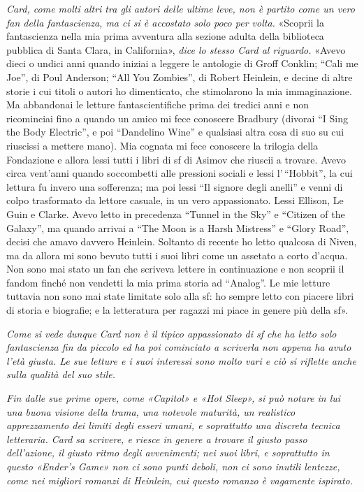 {\emph{{Card, come molti altri tra gli autori delle ultime leve, non è
		partito come un vero fan della fantascienza, ma ci si è accostato solo
		poco per volta.}}{ «Scoprii la fantascienza nella mia prima avventura
	alla sezione adulta della biblioteca pubblica di Santa Clara, in
	California», \emph{dice lo stesso Card al riguardo.} «Avevo dieci o
	undici anni quando iniziai a leggere le antologie di Groff Conklin;
	``Cali me Joe'', di Poul Anderson; ``All You Zombies'', di Robert
	Heinlein, e decine di altre storie i cui titoli o autori ho dimenticato,
	che stimolarono la mia immaginazione. Ma abbandonai le letture
	fantascientifiche prima dei tredici anni e non ricominciai fino a quando
	un amico mi fece conoscere Bradbury (divorai ``I Sing the Body
	Electric'', e poi ``Dandelino Wine'' e qualsiasi altra cosa di suo su
	cui riuscissi a mettere mano). Mia cognata mi fece conoscere la trilogia
	della Fondazione e allora lessi tutti i libri di sf di Asimov che
	riuscii a trovare. Avevo circa vent'anni quando soccombetti alle
	pressioni sociali e lessi l'\,``Hobbit'', la cui lettura fu invero una
	sofferenza; ma poi lessi ``Il signore degli anelli'' e venni di colpo
	trasformato da lettore casuale, in un vero appassionato. Lessi Ellison,
	Le Guin e Clarke. Avevo letto in precedenza ``Tunnel in the Sky'' e
	``Citizen of the Galaxy'', ma quando arrivai a ``The Moon is a Harsh
	Mistress'' e ``Glory Road'', decisi che amavo davvero Heinlein. Soltanto
	di recente ho letto qualcosa di Niven, ma da allora mi sono bevuto tutti
	i suoi libri come un assetato a corto d'acqua. Non sono mai stato un fan
	che scriveva lettere in continuazione e non scoprii il fandom finché non
	vendetti la mia prima storia ad ``Analog''. Le mie letture tuttavia non
	sono mai state limitate solo alla sf: ho sempre letto con piacere libri
	di storia e biografie; e la letteratura per ragazzi mi piace in genere
	più della sf».}

\emph{{Come si vede dunque Card non è il tipico appassionato di sf che
		ha letto solo fantascienza fin da piccolo ed ha poi cominciato a
		scriverla non appena ha avuto l'età giusta. Le sue letture e i suoi
		interessi sono molto vari e ciò si riflette anche sulla qualità del suo
		stile.}}

\emph{{Fin dalle sue prime opere, come «Capitol» e «Hot Sleep», si può
		notare in lui una buona visione della trama, una notevole maturità, un
		realistico apprezzamento dei limiti degli esseri umani, e soprattutto
		una discreta tecnica letteraria. Card sa scrivere, e riesce in genere a
		trovare il giusto passo dell'azione, il giusto ritmo degli avvenimenti;
		nei suoi libri, e soprattutto in questo «Ender's Game» non ci sono punti
		deboli, non ci sono inutili lentezze, come nei migliori romanzi di
		Heinlein, cui questo romanzo è vagamente ispirato.}}

}
